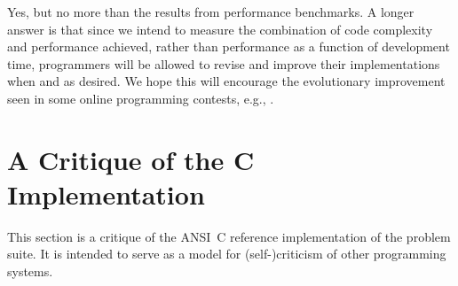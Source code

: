 
Yes,
but no more than the results from performance benchmarks.
A longer answer is that
since we intend to measure the combination of code complexity and performance achieved,
rather than performance as a function of development time,
programmers will be allowed to revise and improve their implementations when and as desired.
We hope this will encourage the evolutionary improvement seen in some online programming contests,
e.g., \cite{b:gulley-contest}.


\section{A Critique of the C Implementation\label{s:critique}}

This section is a critique of the ANSI~C reference implementation of the problem suite.
It is intended to serve as a model for (self-)criticism of other programming systems.

